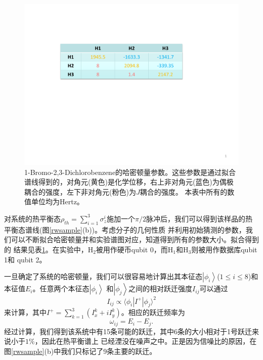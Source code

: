 \begin{figure}[htbp]
            \begin{center}
              \includegraphics[width= 0.8\columnwidth]{figures/rwpara.pdf}
              \caption{ 1-Bromo-2,3-Dichlorobenzene的哈密顿量参数。这些参数是通过拟合谱线得到的，对角元(黄色)是化学位移，右上非对角元(蓝色)为偶极耦合的强度，左下非对角元(粉色)为$J$耦合的强度。
本表中所有的数值单位均为Hertz。}
              \label{rwpara}
            \end{center}
 \end{figure}

对系统的热平衡态$\rho_{th}=\sum\limits_{i=1}^3 \sigma_z^i$施加一个$\pi/2$脉冲后，我们可以得到该样品的热平衡态谱线(图\ref{rwsample}(b))。考虑分子的几何性质
并利用初始猜测的参数，我们可以不断拟合哈密顿量并和实验谱图对应，知道得到所有的参数大小。拟合得到的
结果见表\ref{rwpara}。在实验中，H$_2$被用作硬币qubit 0，而H$_1$和H$_3$则被用作数据库qubit 1和 qubit 2。

一旦确定了系统的哈密顿量，我们可以很容易地计算出其本征态$\left\vert \phi_{i} \right\rangle$($1\leqslant i\leqslant 8$)和本征值$E_i$。任意两个本征态$\left\vert \phi_{i} \right\rangle$ 和$\left\vert \phi_{j} \right\rangle$之间的相对跃迁强度$I_{ij}$可以通过
\begin{equation}
I_{ij}\varpropto \langle \phi_{i} | I^{+} | \phi_{j} \rangle ^2
\end{equation}
来计算，其中$I^+ = \sum_{k=1}^3 (I_x^k+iI_y^k)$。相应的跃迁频率为
\begin{equation} \label{transitions}
\omega_{ij}= E_i-E_j.
\end{equation}
经过计算，我们得到该系统中有15条可能的跃迁，其中6条的大小相对于1号跃迁来说小于$1\%$，因此在热平衡谱上
已经湮没在噪声之中。正是因为信噪比的原因，在图\ref{rwsample}(b)中我们只标记了9条主要的跃迁。

